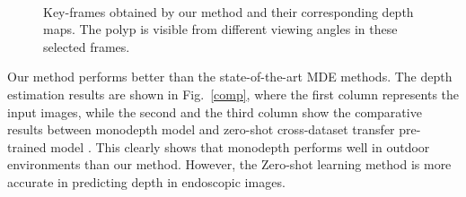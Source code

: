 \documentclass[journal]{IEEEtran}
\begin{document}
\begin{figure}[t]
\\

\caption{Key-frames obtained by our method and their corresponding depth maps. The polyp is visible from different viewing angles in these selected frames.}
\label{answer}
\end{figure}


Our method performs better than the state-of-the-art MDE methods. The depth estimation results are shown in Fig.~\ref{comp}, where the first column represents the input images, while the second and the third column show the comparative results between monodepth model \cite{godard2017unsupervised} and zero-shot cross-dataset transfer pre-trained model \cite{lasinger2019towards}. This clearly shows that monodepth performs well in outdoor environments than our method. However, the Zero-shot learning method is more accurate in predicting depth in endoscopic images. 
\end{document}
